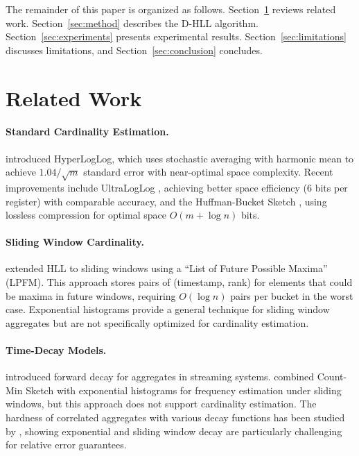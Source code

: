 \documentclass{article}
\begin{document}
The remainder of this paper is organized as follows. Section~\ref{sec:related} reviews related work. Section~\ref{sec:method} describes the D-HLL algorithm. Section~\ref{sec:experiments} presents experimental results. Section~\ref{sec:limitations} discusses limitations, and Section~\ref{sec:conclusion} concludes.

\section{Related Work}\label{sec:related}

\paragraph{Standard Cardinality Estimation.}
\citet{flajolet2007hyperloglog} introduced HyperLogLog, which uses stochastic averaging with harmonic mean to achieve $1.04/\sqrt{m}$ standard error with near-optimal space complexity. Recent improvements include UltraLogLog \citep{ertl2024ultraloglog}, achieving better space efficiency (6 bits per register) with comparable accuracy, and the Huffman-Bucket Sketch \citep{karppa2026huffman}, using lossless compression for optimal space $O(m + \log n)$ bits.

\paragraph{Sliding Window Cardinality.}
\citet{chabchoub2010sliding} extended HLL to sliding windows using a ``List of Future Possible Maxima'' (LPFM). This approach stores pairs of (timestamp, rank) for elements that could be maxima in future windows, requiring $O(\log n)$ pairs per bucket in the worst case. Exponential histograms \citep{datar2002maintaining} provide a general technique for sliding window aggregates but are not specifically optimized for cardinality estimation.

\paragraph{Time-Decay Models.}
\citet{cormode2009forward} introduced forward decay for aggregates in streaming systems. \citet{papapetrou2012sketch} combined Count-Min Sketch with exponential histograms for frequency estimation under sliding windows, but this approach does not support cardinality estimation. The hardness of correlated aggregates with various decay functions has been studied by \citet{cormode2009time}, showing exponential and sliding window decay are particularly challenging for relative error guarantees.
\end{document}
